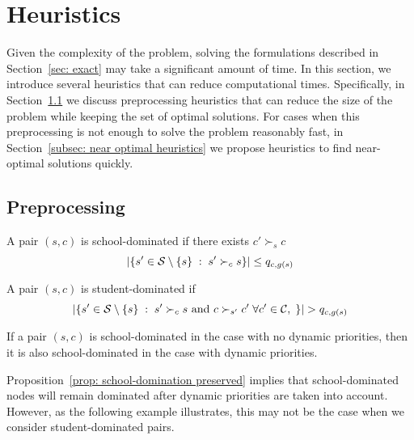 \section{Heuristics}\label{sec: heuristics}

    Given the complexity of the problem, solving the formulations described in Section~\ref{sec: exact} may take a significant amount of time.
    In this section, we introduce several heuristics that can reduce computational times. Specifically, in Section~\ref{subsec: preprocessing} we discuss preprocessing heuristics that can reduce the size of the problem while keeping the set of optimal solutions. For cases when this preprocessing is not enough to solve the problem reasonably fast, in Section~\ref{subsec: near optimal heuristics} we propose heuristics to find near-optimal solutions quickly.

    \subsection{Preprocessing}\label{subsec: preprocessing}

        \begin{proposition}
          A pair \((s,c)\) is school-dominated if there exists \(c' \succ_s c\)
          \[\left|\left\{s' \in \mathcal{S}\setminus \left\{s\right\} \;:\; s'\succ_{c} s\right\}\right| \leq q_{c,g(s)}\]
        \end{proposition}

        \begin{proposition}
          A pair \((s,c)\) is student-dominated if
          \[
          \left|\left\{s'\in \mathcal{S}\setminus \left\{s\right\} \;:\; s' \succ_{c} s \text{ and } c\succ_{s'} c' \; \forall c'\in \mathcal{C}, \; \right\}\right| >  q_{c,g(s)}
          \]
        \end{proposition}


        \begin{proposition}\label{prop: school-domination preserved}
          If a pair \((s,c)\) is school-dominated in the case with no dynamic priorities, then it is also school-dominated in the case with dynamic priorities.
        \end{proposition}

        Proposition~\ref{prop: school-domination preserved} implies that school-dominated nodes will remain dominated after dynamic priorities are taken into account. However, as the following example illustrates, this may not be the case when we consider student-dominated pairs.

